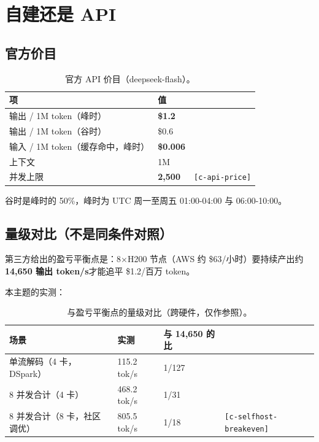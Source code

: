 \section{自建还是 API}

\subsection{官方价目}

\begin{table}[t]
\centering
\footnotesize
\setlength{\tabcolsep}{4pt}
\caption{官方 API 价目（deepseek-flash）。}
\label{tab:15}
\begin{tabular}{lll}
\toprule
项 & 值 &  \\
\midrule
输出 / 1M token（峰时） & \textbf{\$1.2} &  \\
输出 / 1M token（谷时） & \$0.6 &  \\
输入 / 1M token（缓存命中，峰时） & \textbf{\$0.006} &  \\
上下文 & 1M &  \\
并发上限 & \textbf{2,500} & {\scriptsize\texttt{[c-\hspace{0pt}api-\hspace{0pt}price]}} \\
\bottomrule
\end{tabular}
\end{table}

谷时是峰时的 50\%，峰时为 UTC 周一至周五 01:00-\hspace{0pt}04:00 与 06:00-\hspace{0pt}10:00。


\subsection{量级对比（不是同条件对照）}

第三方给出的盈亏平衡点是：8×H200 节点（AWS 约 \$63/小时）要持续产出约 \textbf{14,650 输出 token/s}才能追平 \$1.2/百万 token。


本主题的实测：


\begin{table}[t]
\centering
\footnotesize
\setlength{\tabcolsep}{4pt}
\caption{与盈亏平衡点的量级对比（跨硬件，仅作参照）。}
\label{tab:16}
\begin{tabular}{llll}
\toprule
场景 & 实测 & 与 14,650 的比 &  \\
\midrule
单流解码（4 卡，DSpark） & 115.2 tok/s & 1/127 &  \\
8 并发合计（4 卡） & 468.2 tok/s & 1/31 &  \\
8 并发合计（8 卡，社区调优） & 805.5 tok/s & 1/18 & {\scriptsize\texttt{[c-\hspace{0pt}selfhost-\hspace{0pt}breakeven]}} \\
\bottomrule
\end{tabular}
\end{table}

